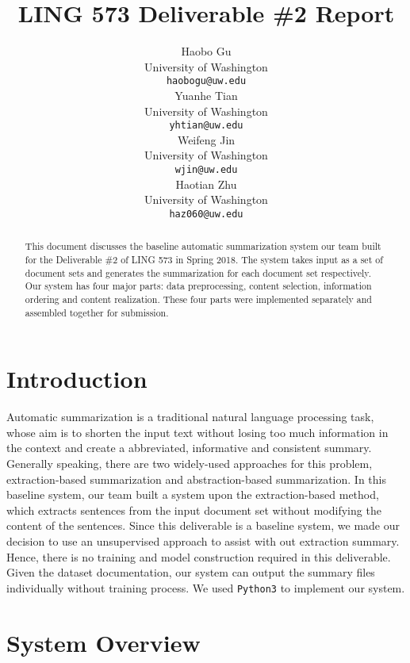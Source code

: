 \documentclass[11pt]{article}
\title{LING 573 Deliverable \#2 Report}
\author{Haobo Gu \\
  \small University of Washington \\
  {\tt haobogu@uw.edu} \\\And
 Yuanhe Tian \\
 \small University of Washington \\
  {\tt yhtian@uw.edu}\\\And
 Weifeng Jin \\
 \small University of Washington \\
  {\tt wjin@uw.edu} \\\And
 Haotian Zhu \\
 \small University of Washington \\
  {\tt haz060@uw.edu}\\}
\date{}
\begin{document}
\maketitle
\begin{abstract}

This document discusses the baseline automatic summarization system our team built for the Deliverable \#2 of LING 573 in Spring 2018. The system takes input as a set of document sets and generates the summarization for each document set respectively. Our system has four major parts: data preprocessing, content selection, information ordering and content realization. These four parts were implemented separately and assembled together for submission.
\end{abstract}

\section{Introduction}

Automatic summarization is a traditional natural language processing task, whose aim is to shorten the input text without losing too much information in the context and create a abbreviated, informative and consistent summary. Generally speaking, there are two widely-used approaches for this problem, extraction-based summarization and abstraction-based summarization. In this baseline system, our team built a system upon the extraction-based method, which extracts sentences from the input document set without modifying the content of the sentences. Since this deliverable is a baseline system, we made our decision to use an unsupervised approach to assist with out extraction summary. Hence, there is no training and model construction required in this deliverable. Given the dataset documentation, our system can output the summary files individually without training process. We used \texttt{Python3} to implement our system.
\section{System Overview}
\end{document}
